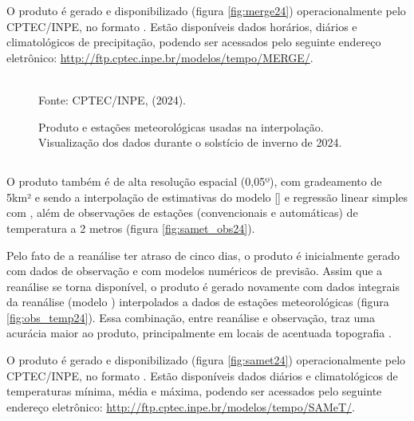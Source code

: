 \indent O produto é gerado e disponibilizado (figura \ref{fig:merge24}) operacionalmente pelo \acrshort{CPTEC}/\acrshort{INPE}, no formato . Estão disponíveis dados horários, diários e climatológicos de precipitação, podendo ser acessados pelo seguinte endereço eletrônico: \url{http://ftp.cptec.inpe.br/modelos/tempo/MERGE/}.

\begin{figure}[htbp]
    \centering
    \caption{Produto  e estações meteorológicas usadas na interpolação. Visualização dos dados durante o solstício de inverno de 2024.} %
    \label{fig:merge_obs24}
    \hfill
    \\
    \small{Fonte: \acrshort{CPTEC}/\acrshort{INPE}, \citeauthor{MERGEatual} (2024).}
\end{figure}

\subsection{}

\indent O produto  também é de alta resolução espacial (0,05º), com gradeamento de 5km² e sendo a interpolação de estimativas do modelo  [] e regressão linear simples com , além de observações de estações (convencionais e automáticas) de temperatura a 2 metros (figura \ref{fig:samet_obs24}).
 
\indent Pelo fato de a reanálise ter atraso de cinco dias, o produto é inicialmente gerado com dados de observação e com modelos numéricos de previsão. Assim que a reanálise se torna disponível, o produto é gerado novamente com dados integrais da reanálise (modelo ) interpolados a dados de estações meteorológicas (figura \ref{fig:obs_temp24}). Essa combinação, entre reanálise e observação, traz uma acurácia maior ao produto, principalmente em locais de acentuada topografia \cite{Rozante2021SAMeT}.

\indent O produto é gerado e disponibilizado (figura \ref{fig:samet24}) operacionalmente pelo \acrshort{CPTEC}/\acrshort{INPE}, no formato . Estão disponíveis dados diários e climatológicos de temperaturas mínima, média e máxima, podendo ser acessados pelo seguinte endereço eletrônico: \url{http://ftp.cptec.inpe.br/modelos/tempo/SAMeT/}.

